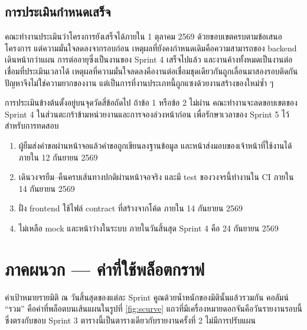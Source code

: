 \subsection{การประเมินกำหนดเสร็จ}

คณะทำงานประเมินว่าโครงการยังเสร็จได้ภายใน 1 ตุลาคม 2569 ด้วยขอบเขตครบตามข้อเสนอโครงการ แต่ความมั่นใจลดลงจากรอบก่อน เหตุผลที่ยังคงกำหนดเดิมคือความสามารถของ backend เดินหน้ากว่าแผน การต่ออายุซึ่งเป็นงานของ Sprint 4 เสร็จไปแล้ว และงานค้างทั้งหมดเป็นงานต่อเชื่อมที่ประเมินเวลาได้ เหตุผลที่ความมั่นใจลดลงคืองานต่อเชื่อมชุดเดียวกันถูกเลื่อนมาสองรอบติดกัน ปัญหาจึงไม่ใช่ความยากของงาน แต่เป็นการที่งานประเภทนี้ถูกแซงด้วยงานสร้างของใหม่ซ้ำ ๆ

การประเมินข้างต้นตั้งอยู่บนจุดวัดสี่ข้อถัดไป ถ้าข้อ 1 หรือข้อ 2 ไม่ผ่าน คณะทำงานจะลดขอบเขตของ Sprint 4 ในส่วนตะกร้าข้ามหน่วยงานและการจองล่วงหน้าก่อน เพื่อรักษาเวลาของ Sprint 5 ไว้สำหรับการทดสอบ

\begin{enumerate}
 \item ผู้ยืมส่งคำขอผ่านหน้าจอแล้วคำขอถูกเขียนลงฐานข้อมูล และหน้าส่งมอบของเจ้าหน้าที่ใช้งานได้ ภายใน 12 กันยายน 2569
 \item เดินวงจรยืม–คืนครบเส้นทางปกติผ่านหน้าจอจริง และมี test ของวงจรนี้ทำงานใน CI ภายใน 14 กันยายน 2569
 \item ฝั่ง frontend ใช้ไฟล์ contract ที่สร้างจากโค้ด ภายใน 14 กันยายน 2569
 \item ไม่เหลือ mock และหน้าว่างในระบบ ภายในวันสิ้นสุด Sprint 4 คือ 24 กันยายน 2569
\end{enumerate}

\clearpage
\section*{ภาคผนวก — ค่าที่ใช้พล็อตกราฟ}

ค่าเป้าหมายรายมิติ ณ วันสิ้นสุดของแต่ละ Sprint คูณด้วยน้ำหนักของมิตินั้นแล้วรวมกัน คอลัมน์ ``รวม'' คือค่าที่พล็อตบนเส้นแผนในรูปที่ \ref{fig:scurve} แถวที่มีเครื่องหมายดอกจันคือวันรายงานรอบนี้ ซึ่งตรงกับขอบ Sprint 3 ตารางนี้เป็นตารางเดียวกับรายงานครั้งที่ 2 ไม่มีการปรับแผน

